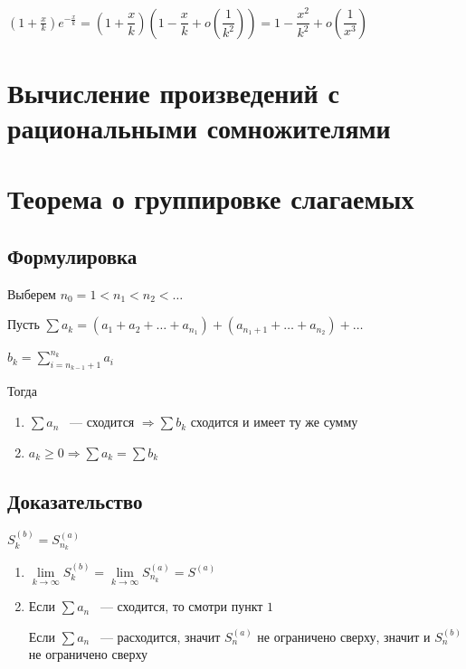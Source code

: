 \documentclass{article}
\begin{document}
            $\left(1 + \frac{x}{k} \right) e^{-\frac{x}{k}} = \left(1 + \dfrac{x}{k} \right) \left( 1 - \dfrac{x}{k} + o \left(\dfrac{1}{k^2} \right) \right) = 1 - \dfrac{x^2}{k^2} + o\left(\dfrac{1}{x^3} \right)$
            
    \newpage
    
    \section{Вычисление произведений с рациональными сомножителями}
    
    \newpage
    
    \section{Теорема о группировке слагаемых}
    
        \subsection{Формулировка}
        
            Выберем $n_0 = 1 < n_1 < n_2 < \ldots$
            
            Пусть $\sum a_k = (a_1 + a_2 + \ldots + a_{n_1}) + (a_{n_1 + 1} + \ldots + a_{n_2}) + \ldots$
            
            $b_k = \sum\limits^{n_k}_{i = n_{k - 1} + 1} a_i$
            
            Тогда
            
            \begin{enumerate}
            
                \item $\sum a_n$ ~--- сходится $\Rightarrow \sum b_k$ сходится и имеет ту же сумму
                
                \item $a_k \geq 0 \Rightarrow \sum a_k = \sum b_k$ 
                
            \end{enumerate}
            
        \subsection{Доказательство} 
            
            $S^{(b)}_k = S^{(a)}_{n_k}$
            
            \begin{enumerate}
            
                \item $\lim\limits_{k \rightarrow \infty} S^{(b)}_k = \lim\limits_{k \rightarrow \infty} S^{(a)}_{n_k} = S^{(a)}$
                
                \item Если $\sum a_n$ ~--- сходится, то смотри пункт $1$
                
                    Если $\sum a_n$ ~--- расходится, значит $S^{(a)}_n$ не ограничено сверху, значит и $S^{(b)}_n$ не ограничено сверху
            
            \end{enumerate}
            
\end{document}
